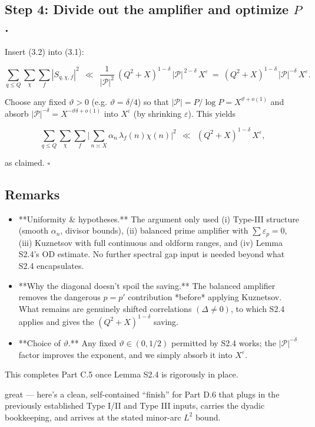 \documentclass[11pt]{article}
\theoremstyle{definition}
\theoremstyle{remark}
\begin{document}
\subsection*{Step 4: Divide out the amplifier and optimize $P$.}
Insert (3.2) into (3.1):

$$
\sum_{q\le Q}\sum_{\chi}\sum_f |S_{q,\chi,f}|^2
\ \ \ll\ \ \frac{1}{|\mathcal P|^2}\ (Q^2+X)^{1-\delta}\,|\mathcal P|^{\,2-\delta}\,X^{\varepsilon}
\ =\ (Q^2+X)^{1-\delta}\,|\mathcal P|^{-\delta}\,X^{\varepsilon}.
$$

Choose any fixed $\vartheta>0$ (e.g. $\vartheta=\delta/4$) so that $|\mathcal P|=P/\log P=X^{\vartheta+o(1)}$ and absorb $|\mathcal P|^{-\delta}=X^{-\vartheta\delta+o(1)}$ into $X^{\varepsilon}$ (by shrinking $\varepsilon$). This yields

$$
\sum_{q\le Q}\sum_{\chi}\sum_f \Big|\sum_{n\asymp X}\alpha_n\,\lambda_f(n)\chi(n)\Big|^2
\ \ \ll\ \ (Q^2+X)^{1-\delta}\,X^{\varepsilon},
$$

as claimed. $\square$

\subsection*{Remarks}

\begin{itemize}
\item **Uniformity \& hypotheses.** The argument only used (i) Type-III structure (smooth $\alpha_n$, divisor bounds), (ii) balanced prime amplifier with $\sum \varepsilon_p=0$, (iii) Kuznetsov with full continuous and oldform ranges, and (iv) Lemma S2.4’s OD estimate. No further spectral gap input is needed beyond what S2.4 encapsulates.

\item **Why the diagonal doesn’t spoil the saving.** The balanced amplifier removes the dangerous $p=p'$ contribution *before* applying Kuznetsov. What remains are genuinely shifted correlations $(\Delta\neq 0)$, to which S2.4 applies and gives the $(Q^2+X)^{1-\delta}$ saving.

\item **Choice of $\vartheta$.** Any fixed $\vartheta\in(0,1/2)$ permitted by S2.4 works; the $|\mathcal P|^{-\delta}$ factor improves the exponent, and we simply absorb it into $X^{\varepsilon}$.
\end{itemize}

This completes Part C.5 once Lemma S2.4 is rigorously in place.

great — here’s a clean, self-contained “finish” for Part D.6 that plugs in the previously established Type I/II and Type III inputs, carries the dyadic bookkeeping, and arrives at the stated minor-arc $L^2$ bound.
\end{document}

